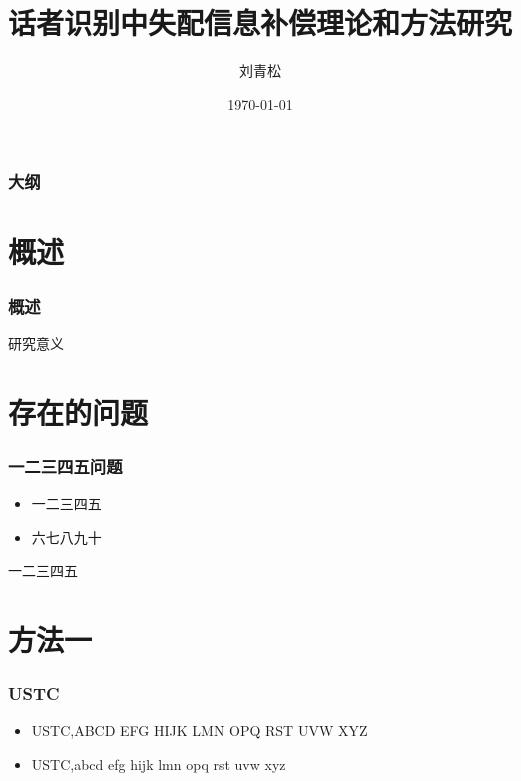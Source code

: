\documentclass[12pt]{ctexbeamer}	%
\title{话者识别中失配信息补偿理论和方法研究}	%
\author[刘青松]{刘青松}
\institute[中国科学技术大学]{
语音信号与信息处理实验室\\
中国科学技术大学，电子科学与技术系
}	%
\date{\today}
\begin{document}
\begin{frame}
\titlepage
\end{frame}


\begin{frame}
\frametitle{大纲}
\tableofcontents
\end{frame}


\section{概述}
\begin{frame}
\frametitle{概述}
研究意义
\end{frame}


\section{存在的问题}

\begin{frame}
\frametitle{一二三四五问题}
\begin{itemize}
\item 一二三四五
\item \alert{六七八九十}
\end{itemize}
\pause
一二三四五

\end{frame}


\section{方法一}

\begin{frame}
\frametitle{USTC}

\begin{itemize}
\item<1-> USTC,ABCD EFG HIJK LMN OPQ RST UVW XYZ
\item<2-> USTC,abcd efg hijk lmn opq rst uvw xyz
\end{itemize}


\end{frame}
\end{document}
